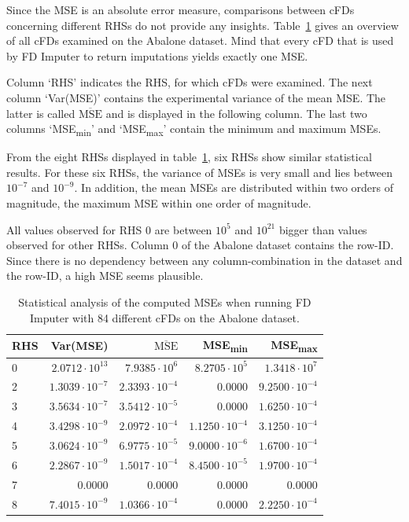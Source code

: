 Since the MSE is an absolute error measure, comparisons between cFDs concerning different RHSs do not provide any insights.
Table~\ref{tab:fd-imputer-mse-abalone} gives an overview of all cFDs examined on the Abalone dataset.
Mind that every cFD that is used by FD Imputer to return imputations yields exactly one MSE.

Column `RHS' indicates the RHS, for which cFDs were examined.
The next column `Var(MSE)' contains the experimental variance of the mean MSE.
The latter is called \( \overline{\text{MSE}} \) and is displayed in the following column.
The last two columns `MSE\textsubscript{min}' and `MSE\textsubscript{max}' contain the minimum and maximum MSEs.

From the eight RHSs displayed in table~\ref{tab:fd-imputer-mse-abalone}, six RHSs show similar statistical results.
For these six RHSs, the variance of MSEs is very small and lies between \( 10^{-7} \) and \( 10^{-9} \).
In addition, the mean MSEs are distributed within two orders of magnitude, the maximum MSE within one order of magnitude.

All values observed for RHS 0 are between \( 10^{5} \) and \( 10^{21} \) bigger than values observed for other RHSs.
Column 0 of the Abalone dataset contains the row-ID.
Since there is no dependency between any column-combination in the dataset and the row-ID, a high MSE seems plausible.

\begin{table}[ht]
    \centering
    \begin{tabular}{lrrrr}
        \toprule
        \toprule
        RHS & Var(MSE) & \( \overline{\text{MSE}} \) & MSE\textsubscript{min} & MSE\textsubscript{max} \\
        \midrule
        0 & \( 2.0712 \cdot 10^{13} \) & \( 7.9385 \cdot 10^{6} \) & \( 8.2705 \cdot 10^{5} \) & \( 1.3418 \cdot 10^{7} \) \\
        2 & \( 1.3039 \cdot 10^{-7} \) & \( 2.3393 \cdot 10^{-4} \) & 0.0000 & \( 9.2500 \cdot 10^{-4} \) \\
        3 & \( 3.5634 \cdot 10^{-7} \) & \( 3.5412 \cdot 10^{-5} \) & 0.0000 & \( 1.6250 \cdot 10^{-4} \) \\
        4 & \( 3.4298 \cdot 10^{-9} \) & \( 2.0972 \cdot 10^{-4} \) & \( 1.1250 \cdot 10^{-4} \) & \( 3.1250 \cdot 10^{-4} \) \\
        5 & \( 3.0624 \cdot 10^{-9} \) & \( 6.9775 \cdot 10^{-5} \) & \( 9.0000 \cdot 10^{-6} \) & \( 1.6700 \cdot 10^{-4} \) \\
        6 & \( 2.2867 \cdot 10^{-9} \) & \( 1.5017 \cdot 10^{-4} \) & \( 8.4500 \cdot 10^{-5} \) & \( 1.9700 \cdot 10^{-4} \) \\
        7 & 0.0000 & 0.0000 & 0.0000 & 0.0000 \\
        8 & \( 7.4015 \cdot 10^{-9} \) & \( 1.0366 \cdot 10^{-4} \) & 0.0000 & \( 2.2250 \cdot 10^{-4} \) \\
        \bottomrule
        \bottomrule
    \end{tabular}
    \caption{Statistical analysis of the computed MSEs when running FD Imputer with 84 different cFDs on the Abalone dataset.}\label{tab:fd-imputer-mse-abalone}
\end{table}

